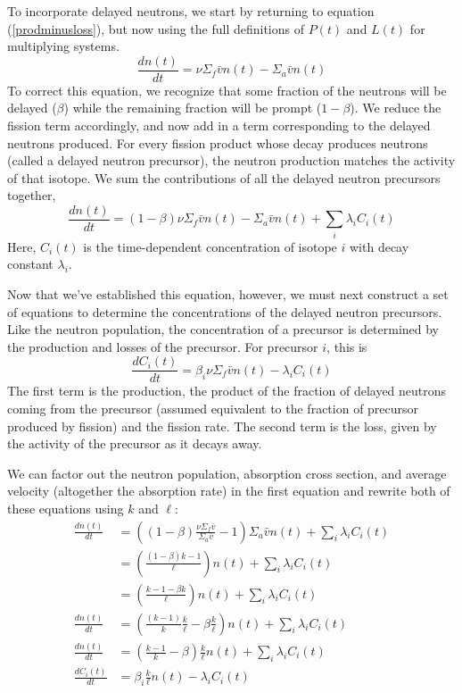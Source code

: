 \documentclass{report}
\begin{document}
To incorporate delayed neutrons, we start by returning to equation (\ref{prodminusloss}), but now using the full definitions of $P(t)$ and $L(t)$ for multiplying systems.
$$ \frac{dn(t)}{dt} = \nu\Sigma_f\bar{v}n(t) - \Sigma_a\bar{v}n(t) $$
To correct this equation, we recognize that some fraction of the neutrons will be delayed ($\beta$) while the remaining fraction will be prompt ($1-\beta$). We reduce the fission term accordingly, and now add in a term corresponding to the delayed neutrons produced. For every fission product whose decay produces neutrons (called a delayed neutron precursor), the neutron production matches the activity of that isotope. We sum the contributions of all the delayed neutron precursors together,
$$ \frac{dn(t)}{dt} = (1-\beta)\nu\Sigma_f\bar{v}n(t) - \Sigma_a\bar{v}n(t) + \sum_i \lambda_i C_i(t)$$
Here, $C_i(t)$ is the time-dependent concentration of isotope $i$ with decay constant $\lambda_i$.

Now that we've established this equation, however, we must next construct a set of equations to determine the concentrations of the delayed neutron precursors. Like the neutron population, the concentration of a precursor is determined by the production and losses of the precursor. For precursor $i$, this is
$$ \frac{dC_i(t)}{dt} = \beta_i \nu \Sigma_f \bar{v} n(t) - \lambda_i C_i(t) $$
The first term is the production, the product of the fraction of delayed neutrons coming from the precursor (assumed equivalent to the fraction of precursor produced by fission) and the fission rate. The second term is the loss, given by the activity of the precursor as it decays away. 

We can factor out the neutron population, absorption cross section, and average velocity (altogether the absorption rate) in the first equation and rewrite both of these equations using $k$ and $\ell$:
\begin{align*}
\frac{dn(t)}{dt}	&= \left((1-\beta)\frac{\nu\Sigma_f\bar{v}}{\Sigma_a\bar{v}} - 1\right)\Sigma_a \bar{v} n(t) + \sum_i \lambda_i C_i(t) \\
					&= \left(\frac{(1-\beta)k - 1}{\ell}\right)n(t) + \sum_i \lambda_i C_i(t) \\
					&= \left(\frac{k - 1 -\beta k}{\ell}\right)n(t) + \sum_i \lambda_i C_i(t) \\
\frac{dn(t)}{dt}	&= \left(\frac{(k - 1)}{k}\frac{k}{\ell} - \beta\frac{k}{\ell}\right)n(t) + \sum_i \lambda_i C_i(t) \\
\frac{dn(t)}{dt}	&= \left(\frac{k - 1}{k} - \beta\right)\frac{k}{\ell}n(t) + \sum_i \lambda_i C_i(t) \\
\frac{dC_i(t)}{dt} &= \beta_i \frac{k}{\ell} n(t) - \lambda_i C_i(t)
\end{align*}
\end{document}
